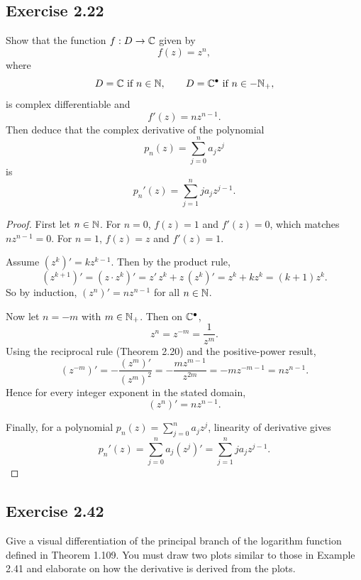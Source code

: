 \documentclass{article}
\begin{document}
\subsection{Exercise 2.22}

Show that the function $f : D \to \mathbb{C}$ given by
\[
  f(z) = z^n,
\]
where
\[
  D = \mathbb{C} \text{ if } n \in \mathbb{N},
  \qquad
  D = \mathbb{C}^\bullet \text{ if } n \in -\mathbb{N}_+,
\]
is complex differentiable and
\[
  f'(z)=n z^{n-1}.
\]
Then deduce that the complex derivative of the polynomial
\[
  p_n(z)=\sum_{j=0}^{n} a_j z^j
\]
is
\[
  p_n'(z)=\sum_{j=1}^{n} j a_j z^{j-1}.
\]

\begin{proof}
  First let $n\in\mathbb{N}$. For $n=0$, $f(z)=1$ and $f'(z)=0$, which matches
  $nz^{n-1}=0$. For $n=1$, $f(z)=z$ and $f'(z)=1$.

  Assume $(z^k)'=kz^{k-1}$. Then by the product rule,
  \[
    (z^{k+1})'=(z\cdot z^k)'=z'\,z^k+z\,(z^k)'=z^k+kz^k=(k+1)z^k.
  \]
  So by induction, $(z^n)'=nz^{n-1}$ for all $n\in\mathbb{N}$.

  Now let $n=-m$ with $m\in\mathbb{N}_+$. Then on $\mathbb{C}^\bullet$,
  \[
    z^n=z^{-m}=\frac{1}{z^m}.
  \]
  Using the reciprocal rule (Theorem 2.20) and the positive-power result,
  \[
    (z^{-m})'=-\frac{(z^m)'}{(z^m)^2}
    =-\frac{mz^{m-1}}{z^{2m}}
    =-mz^{-m-1}
    =nz^{n-1}.
  \]
  Hence for every integer exponent in the stated domain,
  \[
    (z^n)'=nz^{n-1}.
  \]

  Finally, for a polynomial $p_n(z)=\sum_{j=0}^n a_j z^j$, linearity of
  derivative gives
  \[
    p_n'(z)=\sum_{j=0}^n a_j (z^j)'
    =\sum_{j=1}^n j a_j z^{j-1}.
  \]
\end{proof}

\subsection{Exercise 2.42}

Give a visual differentiation of the principal branch of the logarithm
function defined in Theorem 1.109.
You must draw two plots similar to those in Example 2.41 and elaborate on
how the derivative is derived from the plots.
\end{document}
